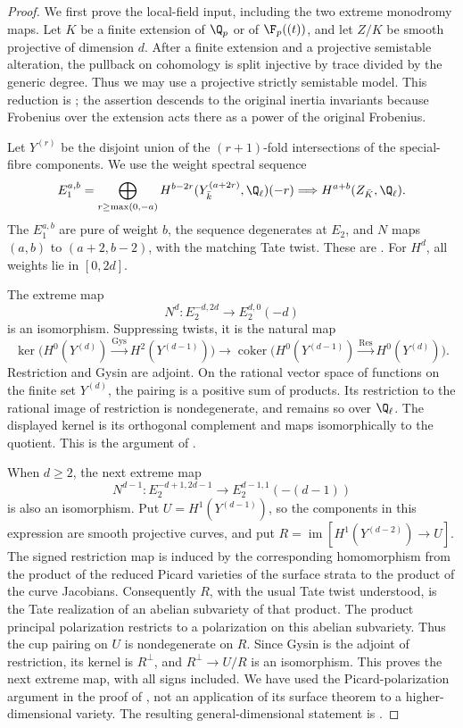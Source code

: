\begin{proof}
We first prove the local-field input, including the two extreme
monodromy maps.  Let $K$ be a finite extension of $\Q_p$ or of
$\F_p((t))$, and let $Z/K$ be smooth projective of dimension $d$.
After a finite extension and a projective semistable alteration,
the pullback on cohomology is split injective by trace divided by
the generic degree.  Thus we may use a projective strictly
semistable model.  This reduction is
\citet[Theorem~6.5, pp.~83--86]{c_dejong1996}; the assertion
descends to the original inertia invariants because Frobenius over
the extension acts there as a power of the original Frobenius.

Let $Y^{(r)}$ be the disjoint union of the $(r+1)$-fold intersections
of the special-fibre components.  We use the weight spectral sequence
\[
 E_1^{a,b}=\bigoplus_{r\geq\max(0,-a)}
 H^{b-2r}(Y^{(a+2r)}_{\bar k},\Q_\ell)(-r)
 \Longrightarrow H^{a+b}(Z_{\bar K},\Q_\ell).
\]
The $E_1^{a,b}$ are pure of weight $b$, the sequence degenerates at
$E_2$, and $N$ maps $(a,b)$ to $(a+2,b-2)$, with the matching
Tate twist.  These are
\citet[Satz~2.10 and (2.11), pp.~40--41]{c_rapoportzink1982}.
For $H^d$, all weights lie in $[0,2d]$.

The extreme map
\[
 N^d:E_2^{-d,2d}\longrightarrow E_2^{d,0}(-d)
\]
is an isomorphism.  Suppressing twists, it is the natural map
\[
 \ker\bigl(H^0(Y^{(d)})\xrightarrow{\mathrm{Gys}}
 H^2(Y^{(d-1)})\bigr)
 \longrightarrow
 \operatorname{coker}\bigl(H^0(Y^{(d-1)})
 \xrightarrow{\mathrm{Res}}H^0(Y^{(d)})\bigr).
\]
Restriction and Gysin are adjoint.  On the rational vector space
of functions on the finite set $Y^{(d)}$, the pairing is a positive
sum of products.  Its restriction to the rational image of
restriction is nondegenerate, and remains so over $\Q_\ell$.
The displayed kernel is its orthogonal complement and maps
isomorphically to the quotient.  This is the argument of
\citet[Proposition~1.5, p.~9]{c_yamamura2026weights}.

When $d\geq2$, the next extreme map
\[
 N^{d-1}:E_2^{-d+1,2d-1}\longrightarrow
 E_2^{d-1,1}(-(d-1))
\]
is also an isomorphism.  Put $U=H^1(Y^{(d-1)})$, so the components
in this expression are smooth projective curves, and put
$R=\operatorname{im}[H^1(Y^{(d-2)})\to U]$.
The signed restriction map is induced by the corresponding
homomorphism from the product of the reduced Picard varieties of
the surface strata to the product of the curve Jacobians.
Consequently $R$, with the usual Tate twist understood, is the
Tate realization of an abelian subvariety of that product.
The product principal polarization restricts to a polarization on
this abelian subvariety.  Thus the cup pairing on $U$ is
nondegenerate on $R$.  Since Gysin is the adjoint of restriction,
its kernel is $R^\perp$, and $R^\perp\to U/R$ is an isomorphism.
This proves the next extreme map, with all signs included.
We have used the Picard-polarization argument in the proof of
\citet[Satz~2.13, pp.~41--43, especially p.~42]{c_rapoportzink1982},
not an application of its surface theorem to a higher-dimensional
variety.  The resulting general-dimensional statement is
\citet[Proposition~1.7, p.~10]{c_yamamura2026weights}.


\end{proof}
